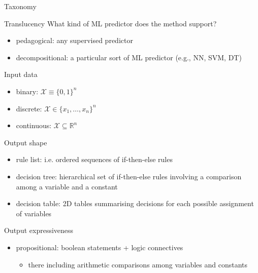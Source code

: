 \documentclass[presentation]{beamer}\mode<presentation>{\usetheme{AMSBolognaFC}}
\begin{document}
\begin{frame}[allowframebreaks]{Taxonomy}
    \begin{block}{Translucency}
       What kind of ML predictor does the \ske{} method support?
        \begin{itemize}
            \item pedagogical: any supervised predictor
            \item decompositional: a particular sort of ML predictor (e.g., NN, SVM, DT)      
        \end{itemize} 
     \end{block}

    \begin{block}{Input data}
        \begin{itemize}
            \item binary: $\mathcal{X} \equiv \{0, 1\}^n$
            \item discrete: $\mathcal{X} \in \{x_1, \ldots, x_n\}^n$   
            \item continuous: $\mathcal{X} \subseteq \mathbb{R}^n$     
        \end{itemize} 
    \end{block}
        
    \framebreak
        
    \begin{block}{Output shape}
        \begin{itemize}
            \item rule list: i.e. ordered sequences of if-then-else rules
            \item decision tree: hierarchical set of if-then-else rules involving a comparison among a variable and a constant   
            \item decision table: 2D tables summarising decisions for each possible assignment of variables 
        \end{itemize} 
    \end{block}
        
    \framebreak
        
    \begin{block}{Output expressiveness}
        \begin{itemize}
            \item propositional: boolean statements + logic connectives
            \begin{itemize}
                \item there including arithmetic comparisons among variables and constants
            \end{itemize}
            

\end{itemize}
\end{block}
\end{frame}
\end{document}
